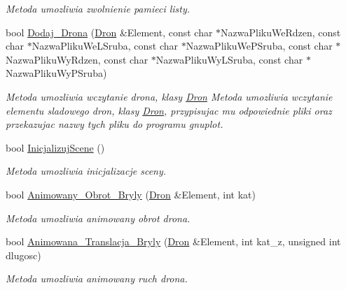\begin{DoxyCompactItemize}
\begin{DoxyCompactList}\small\item\em Metoda umozliwia zwolnienie pamieci listy. \end{DoxyCompactList}\item 
bool \hyperlink{classScena_ae4a2e4ac47a7d7183c3dd868d592a649}{Dodaj\+\_\+\+Drona} (\hyperlink{classDron}{Dron} \&Element, const char $\ast$Nazwa\+Pliku\+We\+Rdzen, const char $\ast$Nazwa\+Pliku\+We\+L\+Sruba, const char $\ast$Nazwa\+Pliku\+We\+P\+Sruba, const char $\ast$Nazwa\+Pliku\+Wy\+Rdzen, const char $\ast$Nazwa\+Pliku\+Wy\+L\+Sruba, const char $\ast$Nazwa\+Pliku\+Wy\+P\+Sruba)
\begin{DoxyCompactList}\small\item\em Metoda umozliwia wczytanie drona, klasy \hyperlink{classDron}{Dron} Metoda umozliwia wczytanie elementu sladowego dron, klasy \hyperlink{classDron}{Dron}, przypisujac mu odpowiednie pliki oraz przekazujac nazwy tych pliku do programu {\itshape gnuplot}. \end{DoxyCompactList}\item 
bool \hyperlink{classScena_a296cfc0d95b90f8818fc5a1bbd073929}{Inicjalizuj\+Scene} ()
\begin{DoxyCompactList}\small\item\em Metoda umozliwia inicjalizacje sceny. \end{DoxyCompactList}\item 
bool \hyperlink{classScena_a12ddfaedd1f01ba311e5b6ecba34840f}{Animowany\+\_\+\+Obrot\+\_\+\+Bryly} (\hyperlink{classDron}{Dron} \&Element, int kat)
\begin{DoxyCompactList}\small\item\em Metoda umozliwia animowany obrot drona. \end{DoxyCompactList}\item 
bool \hyperlink{classScena_acb95c285091570758e28c06dfa4f6d66}{Animowana\+\_\+\+Translacja\+\_\+\+Bryly} (\hyperlink{classDron}{Dron} \&Element, int kat\+\_\+z, unsigned int dlugosc)
\begin{DoxyCompactList}\small\item\em Metoda umozliwia animowany ruch drona. \end{DoxyCompactList}\end{DoxyCompactItemize}
